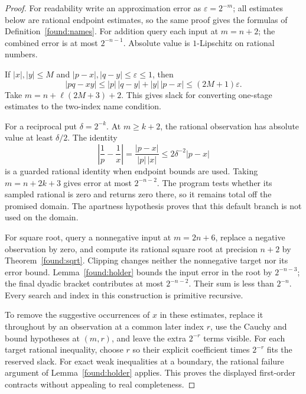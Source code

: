 \begin{proof}
For readability write an approximation error as $\varepsilon=2^{-m}$; all estimates below are rational endpoint estimates, so the same proof gives the formulas of Definition~\ref{found:names}. For addition query each input at $m=n+2$; the combined error is at most $2^{-n-1}$. Absolute value is $1$-Lipschitz on rational numbers.

If $|x|,|y|\le M$ and $|p-x|,|q-y|\le\varepsilon\le1$, then
\[
 |pq-xy|\le |p|\,|q-y|+|y|\,|p-x|
             \le(2M+1)\varepsilon.
\]
Take $m=n+\ell(2M+3)+2$. This gives slack for converting one-stage estimates to the two-index name condition.

For a reciprocal put $\delta=2^{-k}$. At $m\ge k+2$, the rational observation has absolute value at least $\delta/2$. The identity
\[
 \left|\frac1p-\frac1x\right|
   =\frac{|p-x|}{|p|\,|x|}
   \le 2\delta^{-2}|p-x|
\]
is a guarded rational identity when endpoint bounds are used. Taking
$m=n+2k+3$ gives error at most $2^{-n-2}$. The program tests whether its sampled rational is zero and returns zero there, so it remains total off the promised domain. The apartness hypothesis proves that this default branch is not used on the domain.

For square root, query a nonnegative input at $m=2n+6$, replace a negative observation by zero, and compute its rational square root at precision $n+2$ by Theorem~\ref{found:sqrt}. Clipping changes neither the nonnegative target nor its error bound. Lemma~\ref{found:holder} bounds the input error in the root by $2^{-n-3}$; the final dyadic bracket contributes at most $2^{-n-2}$. Their sum is less than $2^{-n}$. Every search and index in this construction is primitive recursive.

To remove the suggestive occurrences of $x$ in these estimates, replace it throughout by an observation at a common later index $r$, use the Cauchy and bound hypotheses at $(m,r)$, and leave the extra $2^{-r}$ terms visible. For each target rational inequality, choose $r$ so their explicit coefficient times $2^{-r}$ fits the reserved slack. For exact weak inequalities at a boundary, the rational failure argument of Lemma~\ref{found:holder} applies. This proves the displayed first-order contracts without appealing to real completeness.
\end{proof}

